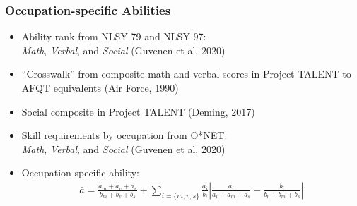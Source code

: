 \documentclass[11pt]{beamer}
\begin{document}
		\begin{frame}
			\frametitle{Occupation-specific Abilities}
			\begin{itemize}
				\item Ability rank from NLSY 79 and NLSY 97: \\
				\textit{Math}, \textit{Verbal}, and \textit{Social} (Guvenen et al, 2020)
				\item ``Crosswalk'' from composite math and verbal scores in Project TALENT to AFQT equivalents (Air Force, 1990)
				\item Social composite in Project TALENT (Deming, 2017)
				\item Skill requirements by occupation from O*NET: \\
				\textit{Math}, \textit{Verbal}, and \textit{Social} (Guvenen et al, 2020)
				\item Occupation-specific ability:
				\begin{align*}
					\bar{a}=\frac{a_m+a_v+a_s}{b_m+b_v+b_s}+\sum_{i=\{m,v,s\}}\frac{a_i}{b_i}\left|\frac{a_i}{a_v+a_m+a_s}-\frac{b_i}{b_v+b_m+b_s}\right|\nonumber
				\end{align*}  
			\end{itemize}
		\end{frame}
		
		
\end{document}

